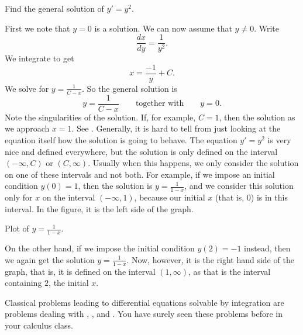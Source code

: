 \begin{example}
Find the general solution of
$y' = y^2$.

First we note that $y=0$ is a solution.  We can now assume that $y \not= 0$.
Write
\begin{equation*}
\frac{dx}{dy} = \frac{1}{y^2} .
\end{equation*}
We integrate to get
\begin{equation*}
x = \frac{-1}{y} + C .
\end{equation*}
We solve for $y = \frac{1}{C-x}$.
So the general solution is
\begin{equation*}
y = \frac{1}{C-x} \qquad \text{together with} \qquad y = 0.
\end{equation*}
Note the singularities of the solution.  If, for example, $C=1$, then the
solution  as we approach $x=1$.  See
.  Generally,
it is hard to tell
from just looking at the equation itself how the solution is going to behave.
The equation $y' = y^2$ is very nice and defined everywhere, but
the solution is only defined on the interval $(-\infty, C)$ or
$(C, \infty)$.  Usually when this happens, we only consider the solution
on one of these intervals and not both.
For example, if we impose an initial condition $y(0) = 1$, then
the solution is $y=\frac{1}{1-x}$, and we consider this solution only
for $x$ on the interval $(-\infty,1)$, because our initial $x$ (that is,
$0$) is in this interval.
In the figure, it is the left side of the graph.
\begin{myfig}
\capstart
{}
\caption{Plot of $y=\frac{1}{1-x}$.\label{1over1mx:fig}}
\end{myfig}

On the other hand, if we impose the initial condition $y(2)=-1$ instead, then we again get
the solution $y=\frac{1}{1-x}$.  Now, however, it is the right hand side of
the graph, that is, it is defined on the interval $(1,\infty)$, as
that is the interval containing $2$, the initial $x$.
\end{example}

Classical problems leading to differential equations solvable by integration
are problems 
dealing with ,
, and .  You have surely seen these
problems before in your calculus class.

